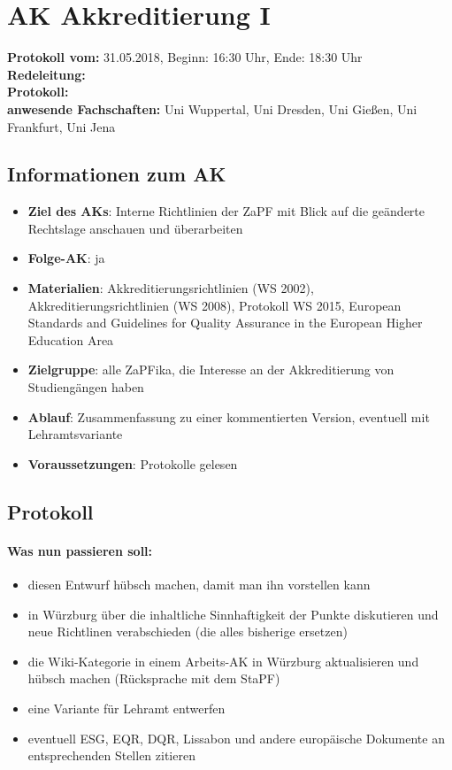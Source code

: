 
\section{AK Akkreditierung I}

  \textbf{Protokoll vom:} 31.05.2018, %
  Beginn: 16:30 Uhr, %
  Ende: 18:30 Uhr \\ %
  \textbf{Redeleitung:} \\ %
  \textbf{Protokoll:} \\ %
  \textbf{anwesende Fachschaften:} Uni Wuppertal, Uni Dresden, Uni Gießen, Uni Frankfurt, Uni Jena

  \subsection*{Informationen zum AK}
    \begin{itemize}
    	\item \textbf{Ziel des AKs}: Interne Richtlinien der ZaPF mit Blick auf die geänderte Rechtslage anschauen und überarbeiten
    	\item \textbf{Folge-AK}: ja
      \item \textbf{Materialien}: Akkreditierungsrichtlinien (WS 2002), Akkreditierungsrichtlinien (WS 2008), Protokoll WS 2015, European Standards and Guidelines for Quality Assurance in the European Higher Education Area
    	\item \textbf{Zielgruppe}: alle ZaPFika, die Interesse an der Akkreditierung von Studiengängen haben
    	\item \textbf{Ablauf}: Zusammenfassung zu einer kommentierten Version, eventuell mit Lehramtsvariante
    	\item \textbf{Voraussetzungen}: Protokolle gelesen
    \end{itemize}

  \subsection*{Protokoll}
    \paragraph{Was nun passieren soll:}
      \begin{itemize}
        \item diesen Entwurf hübsch machen, damit man ihn vorstellen kann
        \item in Würzburg über die inhaltliche Sinnhaftigkeit der Punkte diskutieren und neue Richtlinen verabschieden (die alles bisherige ersetzen)
        \item die Wiki-Kategorie in einem Arbeits-AK in Würzburg aktualisieren und hübsch machen (Rücksprache mit dem StaPF)
        \item eine Variante für Lehramt entwerfen
        \item eventuell ESG, EQR, DQR, Lissabon und andere europäische Dokumente an entsprechenden Stellen zitieren
      \end{itemize}

